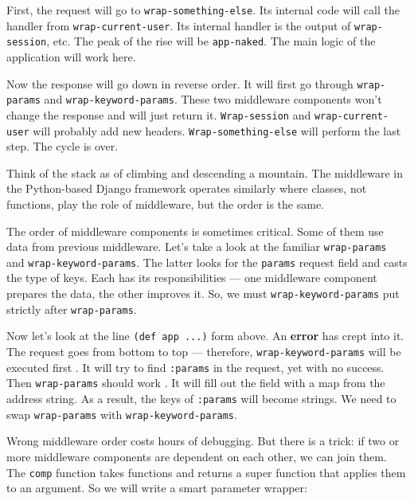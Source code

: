 
First, the request will go to \verb|wrap-something-else|. Its internal code will call the handler from \verb|wrap-current-user|. Its internal handler is the output of \verb|wrap-session|, etc. The peak of the rise will be \verb|app-naked|. The main logic of the application will work here.

Now the response will go down in reverse order. It will first go through \verb|wrap-params| and \verb|wrap-keyword-params|. These two middleware components won't change the response and will just return it. \verb|Wrap-session| and \verb|wrap-current-user| will probably add new headers. \verb|Wrap-something-else| will perform the last step. The cycle is over.


Think of the stack as of climbing and descending a mountain. The middleware in the Python-based Django framework operates similarly where classes, not functions, play the role of middleware, but the order is the same.

The order of middleware components is sometimes critical. Some of them use data from previous middleware. Let's take a look at the familiar \verb|wrap-params| and
\verb|wrap-keyword-params|. The latter looks for the \verb|params| request field and casts the type of keys. Each has its responsibilities — one middleware component prepares the data, the other improves it. So, we must \verb|wrap-keyword-params| put strictly after \verb|wrap-params|.



Now let's look at the line \verb|(def app ...)| form above. An \textbf{error} has crept into it. The request goes from bottom to top — therefore, \verb|wrap-keyword-params| will be executed first . It will try to find \verb|:params| in the request, yet with no success. Then \verb|wrap-params| should work . It will fill out the field with a map from the address string. As a result, the keys of \verb|:params| will become strings. We need to swap \verb|wrap-params| with \verb|wrap-keyword-params|.

Wrong middleware order costs hours of debugging. But there is a trick: if two or more middleware components are dependent on each other, we can join them. The \verb|comp| function takes functions and returns a super function that applies them to an argument. So we will write a smart parameter wrapper:

